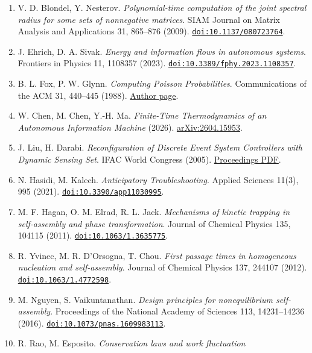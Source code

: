 \documentclass[
  11pt,
]{article}
\newcounter{none} %
\begin{document}
\begin{enumerate}
  \href{https://arxiv.org/abs/1407.5449}{arXiv:1407.5449}.
\item
  V. D. Blondel, Y. Nesterov. \emph{Polynomial-time computation of the
  joint spectral radius for some sets of nonnegative matrices}. SIAM
  Journal on Matrix Analysis and Applications 31, 865--876 (2009).
  \href{https://doi.org/10.1137/080723764}{\nolinkurl{doi:10.1137/080723764}}.
\item
  J. Ehrich, D. A. Sivak. \emph{Energy and information flows in
  autonomous systems}. Frontiers in Physics 11, 1108357 (2023).
  \href{https://doi.org/10.3389/fphy.2023.1108357}{\nolinkurl{doi:10.3389/fphy.2023.1108357}}.
\item
  B. L. Fox, P. W. Glynn. \emph{Computing Poisson Probabilities}.
  Communications of the ACM 31, 440--445 (1988).
  \href{https://web.stanford.edu/~glynn/papers/1988/FG88.html}{Author
  page}.
\item
  W. Chen, M. Chen, Y.-H. Ma. \emph{Finite-Time Thermodynamics of an
  Autonomous Information Machine} (2026).
  \href{https://arxiv.org/abs/2604.15953}{arXiv:2604.15953}.
\item
  J. Liu, H. Darabi. \emph{Reconfiguration of Discrete Event System
  Controllers with Dynamic Sensing Set}. IFAC World Congress (2005).
  \href{https://skoge.folk.ntnu.no/prost/proceedings/ifac2005/Fullpapers/03504.pdf}{Proceedings
  PDF}.
\item
  N. Hasidi, M. Kalech. \emph{Anticipatory Troubleshooting}. Applied
  Sciences 11(3), 995 (2021).
  \href{https://doi.org/10.3390/app11030995}{\nolinkurl{doi:10.3390/app11030995}}.
\item
  M. F. Hagan, O. M. Elrad, R. L. Jack. \emph{Mechanisms of kinetic
  trapping in self-assembly and phase transformation}. Journal of
  Chemical Physics 135, 104115 (2011).
  \href{https://doi.org/10.1063/1.3635775}{\nolinkurl{doi:10.1063/1.3635775}}.
\item
  R. Yvinec, M. R. D'Orsogna, T. Chou. \emph{First passage times in
  homogeneous nucleation and self-assembly}. Journal of Chemical Physics
  137, 244107 (2012).
  \href{https://doi.org/10.1063/1.4772598}{\nolinkurl{doi:10.1063/1.4772598}}.
\item
  M. Nguyen, S. Vaikuntanathan. \emph{Design principles for
  nonequilibrium self-assembly}. Proceedings of the National Academy of
  Sciences 113, 14231--14236 (2016).
  \href{https://doi.org/10.1073/pnas.1609983113}{\nolinkurl{doi:10.1073/pnas.1609983113}}.
\item
  R. Rao, M. Esposito. \emph{Conservation laws and work fluctuation
}
\end{enumerate}
\end{document}
